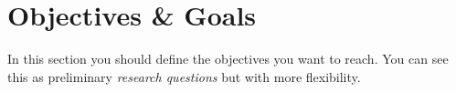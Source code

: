 \section{Objectives \& Goals}
\label{sec:objectives_and_goals}

In this section you should define the objectives you want to reach. You can see this as preliminary \textit{research questions} but with more flexibility. 